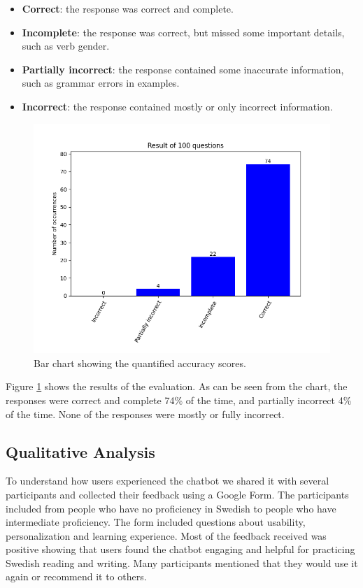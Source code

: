 \documentclass[a4paper,10pt]{article}
\begin{document}
\begin{itemize}
    \item \textbf{Correct}: the response was correct and complete.
    \item \textbf{Incomplete}: the response was correct, but missed some important details, such as verb gender.
    \item \textbf{Partially incorrect}: the response contained some inaccurate information, such as grammar errors in examples.
    \item \textbf{Incorrect}: the response contained mostly or only incorrect information.
\end{itemize}

\begin{figure}[htbp]
    \centering
    \includegraphics[width=0.8\linewidth]{quant_results.png} %
    \caption{Bar chart showing the quantified accuracy scores.}
    \label{fig:quant_results}
\end{figure}

Figure \ref{fig:quant_results} shows the results of the evaluation. As can be seen from the chart, the responses were correct and complete 74\% of the time, and partially incorrect 4\% of the time. None of the responses were mostly or fully incorrect. 

\subsection{Qualitative Analysis}

To understand how users experienced the chatbot we shared it with several participants and collected their feedback using a Google Form. The participants included from people who have no proficiency in Swedish to people who have intermediate proficiency. The form included questions about usability, personalization and learning experience. Most of the feedback received was positive showing that users found the chatbot engaging and helpful for practicing Swedish reading and writing. Many participants mentioned that they would use it again or recommend it to others.
\end{document}
